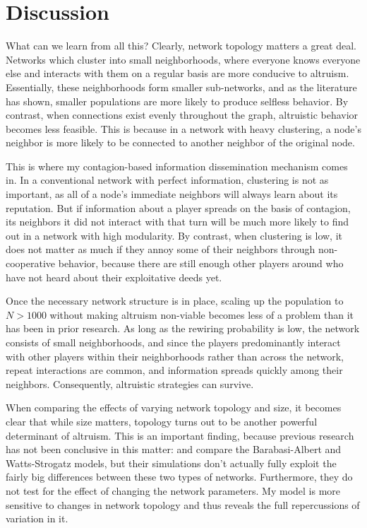\documentclass{JASSS}
\begin{document}
\section{Discussion}
What can we learn from all this? Clearly, network topology matters a great deal. Networks which cluster into small neighborhoods, where everyone knows everyone else and interacts with them on a regular basis are more conducive to altruism. Essentially, these neighborhoods form smaller sub-networks, and as the literature has shown, smaller populations are more likely to produce selfless behavior. By contrast, when connections exist evenly throughout the graph, altruistic behavior becomes less feasible. This is because in a network with heavy clustering, a node's neighbor is more likely to be connected to another neighbor of the original node.

This is where my contagion-based information dissemination mechanism comes in. In a conventional network with perfect information, clustering is not as important, as all of a node's immediate neighbors will always learn about its reputation. But if information about a player spreads on the basis of contagion, its neighbors it did not interact with that turn will be much more likely to find out in a network with high modularity. By contrast, when clustering is low, it does not matter as much if they annoy some of their neighbors through non-cooperative behavior, because there are still enough other players around who have not heard about their exploitative deeds yet.

Once the necessary network structure is in place, scaling up the population to $N>1000$ without making altruism non-viable becomes less of a problem than it has been in prior research. As long as the rewiring probability is low, the network consists of small neighborhoods, and since the players predominantly interact with other players within their neighborhoods rather than across the network, repeat interactions are common, and information spreads quickly among their neighbors. Consequently, altruistic strategies can survive.

When comparing the effects of varying network topology and size, it becomes clear that while size matters, topology turns out to be another powerful determinant of altruism. This is an important finding, because previous research has not been conclusive in this matter: \cite{Santos2008} and \cite{Peleteiro2014} compare the Barabasi-Albert and Watts-Strogatz models, but their simulations don't actually fully exploit the fairly big differences between these two types of networks. Furthermore, they do not test for the effect of changing the network parameters. My model is more sensitive to changes in network topology and thus reveals the full repercussions of variation in it.
\end{document}
